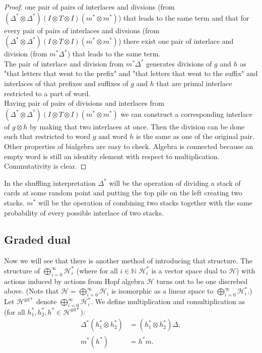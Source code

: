 \documentclass[a4paper, 12pt]{report}
\newcommand{\gdd}[1]{#1^{\mathrm{gd}*}}
\begin{document}
\begin{proof}
one pair of pairs of interlaces and divsions (from $(\Delta^*\otimes \Delta^*)(I \otimes T \otimes I)(m^*
\otimes m^*)$) that leads to the same term and that for every pair of pairs of interlaces and divsions (from
$(\Delta^*\otimes \Delta^*)(I \otimes T \otimes I)(m^*\otimes m^*)$) there exist one pair of interlace and
 division (from
$m^*\Delta^*$) that leads to the same term. \\
The pair of interlace and division from $m^*\Delta^*$ generates divisions of $g$ and $h$ as "that letters
that went to the prefix" and "that letters that went to the suffix" and interlaces of that prefixes and
 suffixes of $g$ and $h$ that are primal interlace restricted to a part of word. \\
Having pair of pairs of divisions and interlaces from $(\Delta^*\otimes \Delta^*)(I \otimes T \otimes I)
(m^*\otimes m^*)$ we can construct a corresponding interlace of $g \otimes h$ by making that two interlaces
at once. Then the division can be done such that restricted to word $g$ and word $h$ is the same as one of
the original pair. \\
Other properties of bialgebra are easy to check.
Algebra is connected because an empty word
is still an identity element with respect to multiplication. Commutativity is clear.
\end{proof}
In the shuffling interpretation $\Delta^*$ will be the operation of dividing a stack of cards at some random
point and putting the top pile on the left creating two stacks. $m^*$ will be the operation of combining two
stacks together with the same probability of every possible interlace of two stacks.
\subsection{Graded dual}
Now we will see that there is another method of introducing that structure.
The structure of $\displaystyle\bigoplus^{\infty}_{i = 0} \mathcal{H}_i^*$ (where for all $i \in \mathbb{N}$
$\mathcal{H}_i^*$ is a vector space dual to $\mathcal{H}$) with actions induced by actions
from Hopf algebra $\mathcal{H}$ turns out to be one discrebed above. (Note that $\mathcal{H} =
\displaystyle\bigoplus^{\infty}_{i = 0} \mathcal{H}_i$ is isomorphic as a linear space
to $\displaystyle\bigoplus^{\infty}_{i = 0} \mathcal{H}_i^*$.) \\
\indent Let $\gdd{\mathcal{H}}$ denote $\displaystyle\bigoplus^{\infty}_{i = 0} \mathcal{H}_i^*$.
We define multiplication
\text{$\Delta^* : \mathcal{H}^{\mathrm{gd}*} \otimes \gdd{\mathcal{H}} \to \gdd{\mathcal{H}}$} and
comultiplication
\text{$m^* : \gdd{\mathcal{H}} \to \gdd{\mathcal{H}} \otimes \gdd{\mathcal{H}}$} as
(for all $h_1^*, h_2^*, h^* \in \gdd{\mathcal{H}}$):
\begin{align*}
\Delta^*(h_1^* \otimes h_2^*) &= (h_1^* \otimes h_2^*)\Delta, \\
m^*(h^*) &= h^*m.
\end{align*}
\end{document}
